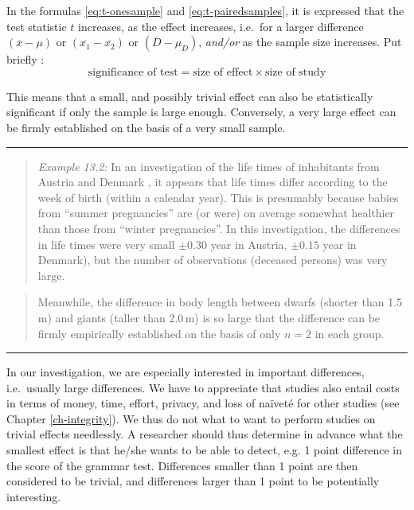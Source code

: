 \documentclass[
]{book}
\begin{document}
In the formulas \eqref{eq:t-onesample} and \eqref{eq:t-pairedsamples}, it is expressed that the test statistic \(t\) increases,
as the effect increases,
i.e.~for a larger difference
\((\overline{x}-\mu)\) or \((\overline{x_1}-\overline{x_2})\) or
\((\overline{D}-\mu_D)\),
\emph{and/or} as the sample size increases.
Put briefly \citep[ p.338, formula 11.10]{Rose08}:
\begin{equation}
  \label{eq:Rose08}
    \textrm{significance of test} = 
    \textrm{size of effect} \times \textrm{size of study}
\end{equation}

This means
that a small, and possibly trivial effect can also be
statistically significant if only the sample is large enough.
Conversely, a very large effect can be firmly established on the basis of
a very small sample.

\begin{center}\rule{0.5\linewidth}{0.5pt}\end{center}

\begin{quote}
\emph{Example 13.2:}
In an investigation of the life times of inhabitants from Austria
and Denmark \citep{Dobl99}, it appears that life times differ according to
the week of birth (within a calendar year). This is presumably because babies from ``summer pregnancies''
are (or were) on average somewhat healthier than those
from ``winter pregnancies''. In this investigation, the differences
in life times were very small \(\pm 0.30\) year in Austria, \(\pm 0.15\) year
in Denmark), but the number of observations (deceased persons) was very large.
\end{quote}

\begin{quote}
Meanwhile, the difference in body length between dwarfs (shorter than
1.5 m) and giants (taller than 2.0 m) is so large that the difference can be firmly
empirically established on the basis of only \(n=2\) in each group.
\end{quote}

\begin{center}\rule{0.5\linewidth}{0.5pt}\end{center}

In our investigation, we are especially interested in important
differences, i.e.~usually large differences. We have to appreciate
that studies also entail costs in terms of money, time,
effort, privacy, and loss of naïveté for other studies
(see Chapter
\ref{ch-integrity}). We thus do not what to want to perform studies
on trivial effects needlessly. A researcher should thus determine in advance
what the smallest effect is that he/she wants to be able to detect, e.g.
1 point difference in the score of the grammar test. Differences smaller than
1 point are then considered to be trivial, and differences larger than 1 point to be potentially
interesting.
\end{document}
